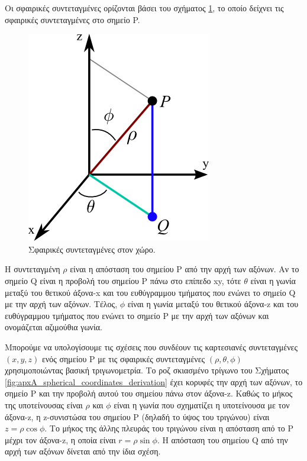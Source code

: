 Οι σφαιρικές συντεταγμένες ορίζονται βάσει του σχήματος \ref{fig:apxA_spherical_coordinates}, το οποίο δείχνει τις σφαιρικές συντεταγμένες στο σημείο P.

\begin{figure}[h]
    \centering
    \includegraphics[scale=0.5]{Figures/appendixA_spherical_coordinates_simple.png}
    \caption{Σφαιρικές συντεταγμένες στον χώρο.}
    \label{fig:apxA_spherical_coordinates}
\end{figure}

Η συντεταγμένη $\rho$ είναι η απόσταση του σημείου P από την αρχή των αξόνων. Αν το σημείο Q είναι η προβολή του σημείου P πάνω στο επίπεδο xy, τότε $\theta$ είναι η γωνία μεταξύ του θετικού άξονα-x και του ευθύγραμμου τμήματος που ενώνει το σημείο Q με την αρχή των αξόνων. Τέλος, $\phi$ είναι η γωνία μεταξύ του θετικού άξονα-z και του ευθύγραμμου τμήματος που ενώνει το σημείο P με την αρχή των αξόνων και ονομάζεται αζιμούθια γωνία.

Μπορούμε να υπολογίσουμε τις σχέσεις που συνδέουν τις καρτεσιανές συντεταγμένες $(x,y,z)$ ενός σημείου P με τις σφαιρικές συντεταγμένες $(\rho, \theta, \phi)$ χρησιμοποιώντας βασική τριγωνομετρία. Το ροζ σκιασμένο τρίγωνο του Σχήματος \ref{fig:apxA_spherical_coordinates_derivation} έχει κορυφές την αρχή των αξόνων, το σημείο P και την προβολή αυτού του σημείου πάνω στον άξονα-z. Καθώς το μήκος της υποτείνουσας είναι $\rho$ και $\phi$ είναι η γωνία που σχηματίζει η υποτείνουσα με τον άξονα-z, η z-συνιστώσα του σημείου P (δηλαδή το ύψος του τριγώνου) είναι $z=\rho \cos \phi$. Το μήκος της άλλης πλευράς του τριγώνου είναι η απόσταση από το P μέχρι τον άξονα-z, η οποία είναι $r= \rho \sin \phi$. Η απόσταση του σημείου Q από την αρχή των αξόνων δίνεται από την ίδια σχέση.

